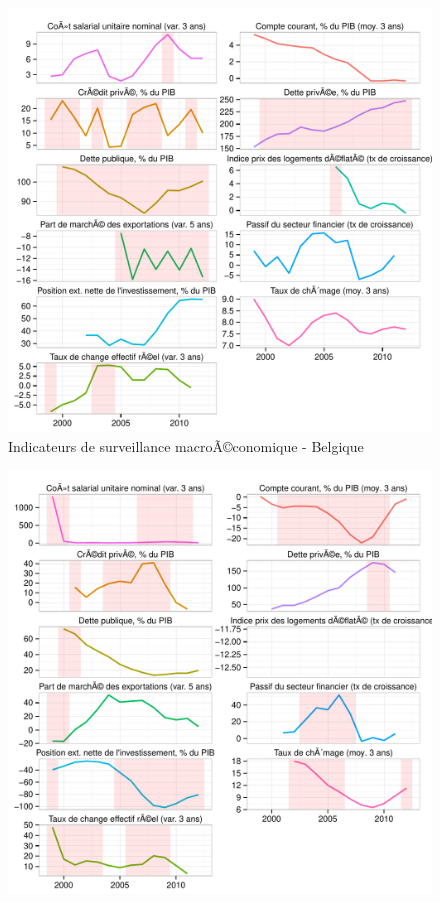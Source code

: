 \documentclass{article}\usepackage[]{graphicx}\usepackage[]{color}
\makeatletter
\def\maxwidth{ %
  \ifdim\Gin@nat@width>\linewidth
    \linewidth
  \else
    \Gin@nat@width
  \fi
}
\newenvironment{knitrout}{}{} %
\makeatother
\begin{document}
\begin{knitrout}
\begin{figure}[p]
{\centering \includegraphics[width=\maxwidth]{figure_graph/byco2} 

}

\caption[Indicateurs de surveillance macroÃ©conomique - Belgique]{Indicateurs de surveillance macroÃ©conomique - Belgique\label{fig:byco2}}
\end{figure}

\begin{figure}[p]


{\centering \includegraphics[width=\maxwidth]{figure_graph/byco3} 

}
\end{figure}
\end{knitrout}
\end{document}
